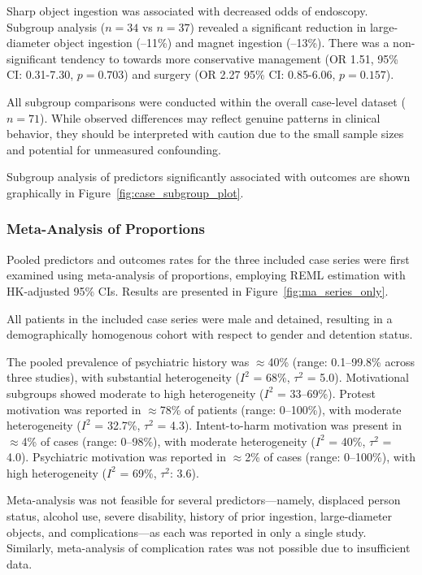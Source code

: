 \documentclass[pdflatex,sn-basic,Numbered]{sn-jnl}
\begin{document}
Sharp object ingestion was associated with decreased odds of endoscopy. Subgroup analysis ($n = 34$ vs $n = 37$) revealed a significant reduction in large-diameter object ingestion (–11\%) and magnet ingestion (–13\%). There was a non-significant tendency to towards more conservative management (OR 1.51, 95\% CI: 0.31-7.30, $p = 0.703$) and surgery (OR 2.27 95\% CI: 0.85-6.06, $p = 0.157$).

All subgroup comparisons were conducted within the overall case-level dataset ($n = 71$). While observed differences may reflect genuine patterns in clinical behavior, they should be interpreted with caution due to the small sample sizes and potential for unmeasured confounding.

Subgroup analysis of predictors significantly associated with outcomes are shown graphically in Figure~\ref{fig:case_subgroup_plot}.

\subsubsection{Meta-Analysis of Proportions}

Pooled predictors and outcomes rates for the three included case series were first examined using meta-analysis of proportions, employing REML estimation with HK-adjusted 95\% CIs. Results are presented in Figure~\ref{fig:ma_series_only}.

All patients in the included case series were male and detained, resulting in a demographically homogenous cohort with respect to gender and detention status.

The pooled prevalence of psychiatric history was $\approx$40\% (range: 0.1--99.8\% across three studies), with substantial heterogeneity ($I^2$ = 68\%, $\tau^2$ = 5.0). Motivational subgroups showed moderate to high heterogeneity ($I^2$ = 33--69\%). Protest motivation was reported in $\approx$78\% of patients (range: 0--100\%), with moderate heterogeneity ($I^2$ = 32.7\%, $\tau^2$ = 4.3). Intent-to-harm motivation was present in $\approx$4\% of cases (range: 0--98\%), with moderate heterogeneity ($I^2$ = 40\%, $\tau^2$ = 4.0). Psychiatric motivation was reported in $\approx$2\% of cases (range: 0--100\%), with high heterogeneity ($I^2$ = 69\%, $\tau^2$: 3.6).

Meta-analysis was not feasible for several predictors—namely, displaced person status, alcohol use, severe disability, history of prior ingestion, large-diameter objects, and complications—as each was reported in only a single study. Similarly, meta-analysis of complication rates was not possible due to insufficient data. 
\end{document}
